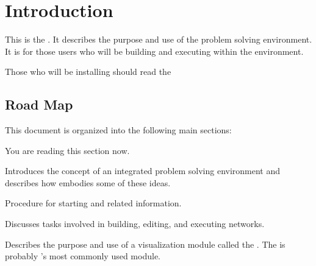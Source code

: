 %

\section{Introduction}
\label{sec:intro}


This is the \etitle{\srug}.  It describes the purpose and use of the \sr{}
problem solving environment.  It is for those users who will be building
and executing  within the \sr{} environment.

Those who will be installing \sr{} should read the




\subsection{Road Map}
\label{sec:roadmap}

This document is organized into the following main sections:

\begin{description}
\item {} You are reading this section now.
\item {} Introduces the concept of an
  integrated problem solving environment  and describes how \SR{}
  embodies some of these ideas.
\item {}  Procedure for starting \sr{}
  and related information.
\item {} Discusses tasks involved in
  building, editing, and executing networks.
\item {} Describes the
  purpose and use of a visualization module called the \viewer{}.  The
  \viewer{} is probably \sr{}'s most commonly used module.
\end{description}


